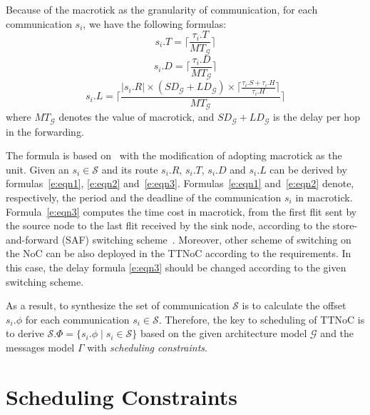 \documentclass[journal]{IEEEtran}
\newcommand{\calG}{\mathcal{G}}
\newcommand{\calS}{\mathcal{S}}
\newcommand{\SD}{\mathit{SD}_\calG}
\newcommand{\HD}{\mathit{LD}_\calG}
\newcommand{\MT}{\mathit{MT}_\calG}
\begin{document}
Because of the macrotick as the granularity of communication,
for each communication $s_{i}$,
we have the following formulas:
\begin{equation}
\label{e:eqn1}
  s_i.T = \lceil\frac{\tau_{i}.T}{\MT} \rceil
\end{equation}
\begin{equation}
\label{e:eqn2}
  s_i.D = \lceil\frac{\tau_{i}.D}{\MT}\rceil
\end{equation}
\begin{equation}
\label{e:eqn3}
  s_i.L = \lceil\frac{|s_i.R| \times (\SD+\HD) \times
    \lceil\frac{\tau_{i}.S + \tau_{i}.H}{\tau_{i}.H  }\rceil}{\MT}\rceil
\end{equation}
where $\MT$ denotes the value of macrotick, and $\SD+\HD$ is the delay
per hop in the forwarding.

The formula is based on~\cite{DBLP:books/daglib/0087651} with the
modification of adopting macrotick as the unit.  Given an
$s_{i}\in\calS$ and its route $s_i.R$, $s_i.T$, $s_i.D$ and $s_i.L$
can be derived by formulas~\ref{e:eqn1}, \ref{e:eqn2}
and~\ref{e:eqn3}.  Formulas~\ref{e:eqn1} and~\ref{e:eqn2} denote,
respectively, the period and the deadline of the communication $s_i$
in macrotick.  Formula~\ref{e:eqn3} computes the time cost in
macrotick, from the first flit sent by the source node to the last
flit received by the sink node, according to the store-and-forward
(SAF) switching scheme~\cite{DBLP:books/daglib/0087651}.  Moreover,
other scheme of switching on the NoC can be also deployed in the TTNoC
according to the requirements. In this case, the delay formula
\ref{e:eqn3} should be changed according to the given switching
scheme.

As a result, to synthesize the set of communication $\calS$ is to
calculate the offset $s_i.\phi$ for each communication
$s_i\in\calS$. Therefore, the key to scheduling of TTNoC is to derive
$\calS.\Phi = \{s_i.\phi\mid s_i\in\calS\}$ based on the given
architecture model $\calG$ and the messages model $\Gamma$ with
\emph{scheduling constraints}.


\section{Scheduling Constraints\label{s:constraint}}
\end{document}
